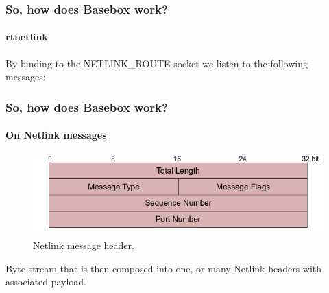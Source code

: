 \documentclass[11pt]{beamer}
\begin{document}
\begin{frame}
\frametitle{So, how does Basebox work?}
\framesubtitle{rtnetlink}

By binding to the NETLINK\_ROUTE socket we listen to the following messages:

{%
\small
{}}

\end{frame}

\begin{frame}
\frametitle{So, how does Basebox work?}
\framesubtitle{On Netlink messages}

\begin{minipage}[t]{0.48\linewidth}
\centering
\begin{figure}
\includegraphics[scale=0.3]{nlmsghdr.png}
\caption{Netlink message header.}
\end{figure}
\end{minipage}
\begin{minipage}[t]{0.48\linewidth}

Byte stream that is then composed into one, or many Netlink headers with associated payload.

\end{minipage}

\end{frame}
\end{document}

